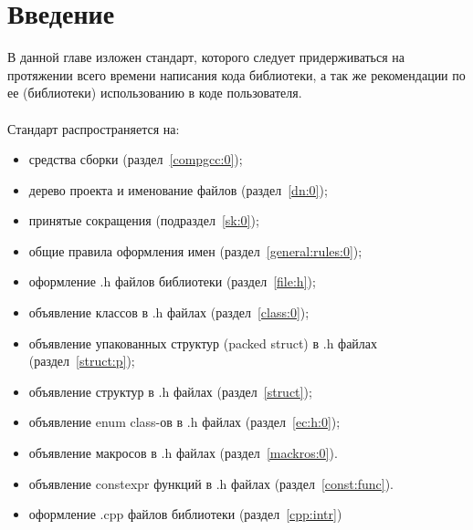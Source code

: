 \chapter{Введение}
В данной главе изложен стандарт, которого следует придерживаться на протяжении всего времени написания кода библиотеки, а так же рекомендации по ее (библиотеки) использованию в коде пользователя.\\\\
Стандарт распространяется на:
\begin{itemize}
	\item средства сборки (раздел~\ref{compgcc:0});
	\item дерево проекта и именование файлов (раздел~\ref{dn:0});
	\item принятые сокращения (подраздел~\ref{sk:0});
	\item общие правила оформления имен (раздел~\ref{general:rules:0});
	\item оформление .h файлов библиотеки (раздел~\ref{file:h});
	\item объявление классов в .h файлах (раздел~\ref{class:0});
	\item объявление упакованных структур (packed struct) в .h файлах (раздел~\ref{struct:p});
	\item объявление структур в .h файлах (раздел~\ref{struct});
	\item объявление enum class-ов в .h файлах (раздел~\ref{ec:h:0});
	\item объявление макросов в .h файлах (раздел~\ref{mackros:0}).
	\item объявление constexpr функций в .h файлах (раздел~\ref{const:func}).
	\item оформление .cpp файлов библиотеки (раздел~\ref{cpp:intr})
\end{itemize}
